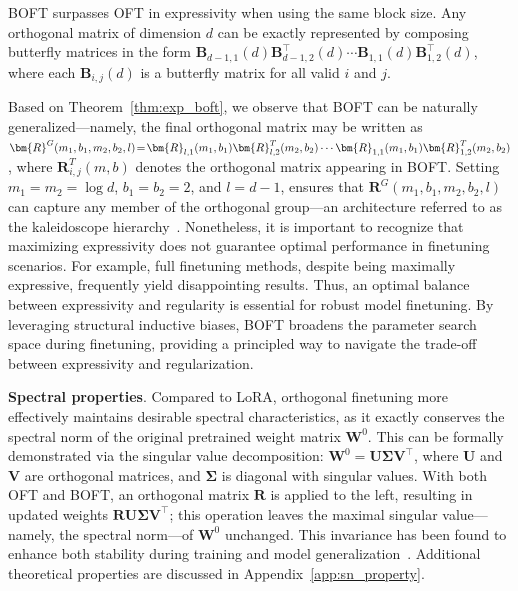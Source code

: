 \begin{theorem}\label{thm:exp_boft}
    BOFT surpasses OFT in expressivity when using the same block size. Any orthogonal matrix of dimension $d$ can be exactly represented by composing butterfly matrices in the form  $\bm{B}_{d-1,1}(d)\bm{B}^\top_{d-1,2}(d)\cdots\bm{B}_{1,1}(d)\bm{B}^\top_{1,2}(d)$, where each $\bm{B}_{i,j}(d)$ is a butterfly matrix for all valid $i$ and $j$.
\end{theorem}

Based on Theorem~\ref{thm:exp_boft}, we observe that BOFT can be naturally generalized—namely, the final orthogonal matrix may be written as $\thickmuskip=2mu \medmuskip=2mu \bm{R}^G(m_1,b_1,m_2,b_2,l)=\bm{R}_{l,1}(m_1,b_1)\bm{R}_{l,2}^T(m_2,b_2)\cdots\bm{R}_{1,1}(m_1,b_1)\bm{R}_{1,2}^T(m_2,b_2)$, where $\bm{R}_{i,j}^T(m,b)$ denotes the orthogonal matrix appearing in BOFT. Setting $m_1=m_2=\log d$, $b_1=b_2=2$, and $l=d-1$, ensures that $\bm{R}^G(m_1,b_1,m_2,b_2,l)$ can capture any member of the orthogonal group—an architecture referred to as the kaleidoscope hierarchy~\cite{dao2019kaleidoscope}. Nonetheless, it is important to recognize that maximizing expressivity does not guarantee optimal performance in finetuning scenarios. For example, full finetuning methods, despite being maximally expressive, frequently yield disappointing results. Thus, an optimal balance between expressivity and regularity is essential for robust model finetuning. By leveraging structural inductive biases, BOFT broadens the parameter search space during finetuning, providing a principled way to navigate the trade-off between expressivity and regularization.

\textbf{Spectral properties}. Compared to LoRA, orthogonal finetuning more effectively maintains desirable spectral characteristics, as it exactly conserves the spectral norm of the original pretrained weight matrix $\bm{W}^0$. This can be formally demonstrated via the singular value decomposition: $\bm{W}^0=\bm{U}\bm{\Sigma}\bm{V}^\top$, where $\bm{U}$ and $\bm{V}$ are orthogonal matrices, and $\bm{\Sigma}$ is diagonal with singular values. With both OFT and BOFT, an orthogonal matrix $\bm{R}$ is applied to the left, resulting in updated weights $\bm{R}\bm{U}\bm{\Sigma}\bm{V}^\top$; this operation leaves the maximal singular value—namely, the spectral norm—of $\bm{W}^0$ unchanged. This invariance has been found to enhance both stability during training and model generalization~\cite{miyato2018spectral,yoshida2017spectral}. Additional theoretical properties are discussed in Appendix~\ref{app:sn_property}.

